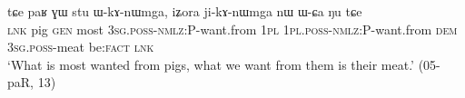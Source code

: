 \documentclass[oneside,a4paper,11pt]{article}
\newcommand{\ipa}[1]{{\phon{#1}}}
\begin{document}








 

\begin{exe}
\ex \label{ex:stu.WkAnWmga}
 \gll tɕe paʁ ɣɯ stu ɯ-kɤ-nɯmga, iʑora ji-kɤ-nɯmga nɯ ɯ-ɕa ŋu tɕe \\
 \textsc{lnk} pig \textsc{gen} most \textsc{3sg}.\textsc{poss}-\textsc{nmlz}:P-want.from \textsc{1pl} \textsc{1pl}.\textsc{poss}-\textsc{nmlz}:P-want.from \textsc{dem} \textsc{3sg}.\textsc{poss}-meat be:\textsc{fact} \textsc{lnk} \\
 \glt  `What is most wanted from pigs, what we want from them is their meat.' (05-paR, 13)
\end{exe}
\end{document}
